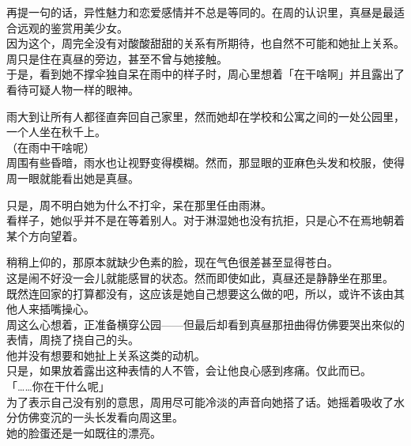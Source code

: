 再提一句的话，异性魅力和恋爱感情并不总是等同的。在周的认识里，真昼是最适合远观的鉴赏用美少女。\\

因为这个，周完全没有对酸酸甜甜的关系有所期待，也自然不可能和她扯上关系。周只是住在真昼的旁边，甚至不曾与她接触。\\

于是，看到她不撑伞独自呆在雨中的样子时，周心里想着「在干啥啊」并且露出了看待可疑人物一样的眼神。\\

\vspace{2\baselineskip}

雨大到让所有人都径直奔回自己家里，然而她却在学校和公寓之间的一处公园里，一个人坐在秋千上。\\

（在雨中干啥呢）\\

周围有些昏暗，雨水也让视野变得模糊。然而，那显眼的亚麻色头发和校服，使得周一眼就能看出她是真昼。

只是，周不明白她为什么不打伞，呆在那里任由雨淋。\\

看样子，她似乎并不是在等着别人。对于淋湿她也没有抗拒，只是心不在焉地朝着某个方向望着。

稍稍上仰的，那原本就缺少色素的脸，现在气色很差甚至显得苍白。\\

这是闹不好没一会儿就能感冒的状态。然而即使如此，真昼还是静静坐在那里。\\

既然连回家的打算都没有，这应该是她自己想要这么做的吧，所以，或许不该由其他人来插嘴操心。\\

周这么心想着，正准备横穿公园——但最后却看到真昼那扭曲得仿佛要哭出來似的表情，周挠了挠自己的头。\\

他并没有想要和她扯上关系这类的动机。\\

只是，如果放着露出这种表情的人不管，会让他良心感到疼痛。仅此而已。\\

「……你在干什么呢」\\

为了表示自己没有别的意思，周用尽可能冷淡的声音向她搭了话。她摇着吸收了水分仿佛变沉的一头长发看向周这里。\\

她的脸蛋还是一如既往的漂亮。

